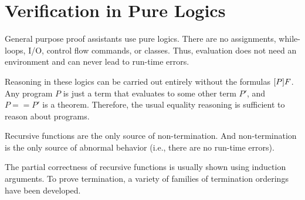 \section{Verification in Pure Logics}

General purpose proof assistants use pure logics.
There are no assignments, while-loops, I/O, control flow commands, or classes.
Thus, evaluation does not need an environment and can never lead to run-time errors.

Reasoning in these logics can be carried out entirely without the formulas $[P]F$.
Any program $P$ is just a term that evaluates to some other term $P'$, and $P==P'$ is a theorem.
Therefore, the usual equality reasoning is sufficient to reason about programs.

Recursive functions are the only source of non-termination.
And non-termination is the only source of abnormal behavior (i.e., there are no run-time errors).

The partial correctness of recursive functions is usually shown using induction arguments.
To prove termination, a variety of families of termination orderings have been developed.
